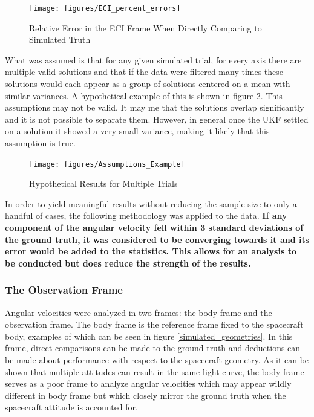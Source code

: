 \begin{figure}[ht]
	\begin{center}
		\texttt{[image: figures/ECI\_percent\_errors]}
		\caption{Relative Error in the ECI Frame When Directly Comparing to Simulated Truth}
		\label{awful_errors}
	\end{center}
\end{figure}

What was assumed is that for any given simulated trial, for every axis there are multiple valid solutions and that if the data were filtered many times these solutions would each appear as a group of solutions centered on a mean with similar variances. A hypothetical example of this is shown in figure \ref{distributions}. This assumptions may not be valid. It may me that the solutions overlap significantly and it is not possible to separate them. However, in general once the UKF settled on a solution it showed a very small variance, making it likely that this assumption is true.

\begin{figure}[ht]
	\begin{center}
		\texttt{[image: figures/Assumptions\_Example]}
		\caption{Hypothetical Results for Multiple Trials}
		\label{distributions}
	\end{center}
\end{figure}

In order to yield meaningful results without reducing the sample size to only a handful of cases, the following methodology was applied to the data. \textbf{If any component of the angular velocity fell within 3 standard deviations of the ground truth, it was considered to be converging towards it and its error would be added to the statistics. This allows for an analysis to be conducted but does reduce the strength of the results.}

\subsubsection{The Observation Frame}

Angular velocities were analyzed in two frames: the body frame and the observation frame. The body frame is the reference frame fixed to the spacecraft body, examples of which can be seen in figure \ref{simulated_geometries}. In this frame, direct comparisons can be made to the ground truth and deductions can be made about performance with respect to the spacecraft geometry. As it can be shown that multiple attitudes can result in the same light curve, the body frame serves as a poor frame to analyze angular velocities which may appear wildly different in body frame but which closely mirror the ground truth when the spacecraft attitude is accounted for. 

